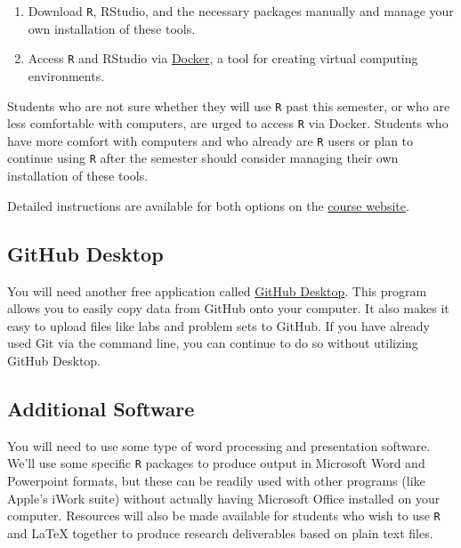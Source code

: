 \documentclass[]{book}
\providecommand{\tightlist}{%
  \setlength{\itemsep}{0pt}\setlength{\parskip}{0pt}}
\theoremstyle{definition}
\theoremstyle{definition}
\theoremstyle{definition}
\theoremstyle{remark}
\begin{document}
\begin{enumerate}
\def\labelenumi{\arabic{enumi}.}
\tightlist
\item
  Download \texttt{R}, RStudio, and the necessary packages manually and
  manage your own installation of these tools.
\item
  Access \texttt{R} and RStudio via
  \href{https://www.docker.com}{Docker}, a tool for creating virtual
  computing environments.
\end{enumerate}

Students who are not sure whether they will use \texttt{R} past this
semester, or who are less comfortable with computers, are urged to
access \texttt{R} via Docker. Students who have more comfort with
computers and who already are \texttt{R} users or plan to continue using
\texttt{R} after the semester should consider managing their own
installation of these tools.

Detailed instructions are available for both options on the
\href{https://slu-soc5050.github.io/course-software/}{course website}.

\hypertarget{github-desktop}{%
\subsection{GitHub Desktop}\label{github-desktop}}

You will need another free application called
\href{https://desktop.github.com}{GitHub Desktop}. This program allows
you to easily copy data from GitHub onto your computer. It also makes it
easy to upload files like labs and problem sets to GitHub. If you have
already used Git via the command line, you can continue to do so without
utilizing GitHub Desktop.

\hypertarget{additional-software}{%
\subsection{Additional Software}\label{additional-software}}

You will need to use some type of word processing and presentation
software. We'll use some specific \texttt{R} packages to produce output
in Microsoft Word and Powerpoint formats, but these can be readily used
with other programs (like Apple's iWork suite) without actually having
Microsoft Office installed on your computer. Resources will also be made
available for students who wish to use \texttt{R} and LaTeX together to
produce research deliverables based on plain text files.
\end{document}
